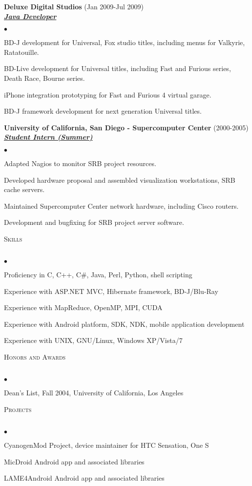 \documentclass{article}
\newcommand{\lineunder}{\vspace*{-8pt} \\ \hspace*{-18pt} \hrulefill \\}
\newcommand{\header}[1]{{\hspace*{-15pt}\vspace*{6pt} \textsc{#1}} \vspace*{-6pt} \lineunder}
\newcommand{\employer}[3]{{ \textbf{#1} (#2)\\ \underline{\textbf{\emph{#3}}}\\  }}
\newenvironment{achievements}{\begin{list}{$\bullet$}{\topsep 0pt \itemsep -2pt}}{\vspace*{4pt}\end{list}}
\begin{document}
\employer{Deluxe Digital Studios}{Jan 2009-Jul 2009}{Java Developer}
  \begin{achievements}
    \item BD-J development for Universal, Fox studio titles, including menus for Valkyrie, Ratatouille.
    \item BD-Live development for Universal titles, including Fast and Furious series, Death Race, Bourne series.
    \item iPhone integration prototyping for Fast and Furious 4 virtual garage.
    \item BD-J framework development for next generation Universal titles.
  \end{achievements}

\employer{University of California, San Diego - Supercomputer Center}{2000-2005}{Student Intern (Summer)}
  \begin{achievements}
    \item Adapted Nagios to monitor SRB project resources.
    \item Developed hardware proposal and assembled visualization workstations, SRB cache servers.
    \item Maintained Supercomputer Center network hardware, including Cisco routers.
    \item Development and bugfixing for SRB project server software.
  \end{achievements}

\header{Skills}
  \begin{achievements}
    \item Proficiency in C, C++, C\#, Java, Perl, Python, shell scripting
    \item Experience with ASP.NET MVC, Hibernate framework, BD-J/Blu-Ray
    \item Experience with MapReduce, OpenMP, MPI, CUDA
    \item Experience with Android platform, SDK, NDK, mobile application development
    \item Experience with UNIX, GNU/Linux, Windows XP/Vista/7
  \end{achievements}

\header{Honors and Awards}
  \begin{achievements}
    \item Dean's List, Fall 2004, University of California, Los Angeles
  \end{achievements}

\header{Projects}
  \begin{achievements}
    \item CyanogenMod Project, device maintainer for HTC Sensation, One S
    \item MicDroid Android app and associated libraries
    \item LAME4Android Android app and associated libraries
  \end{achievements}
\end{document}
